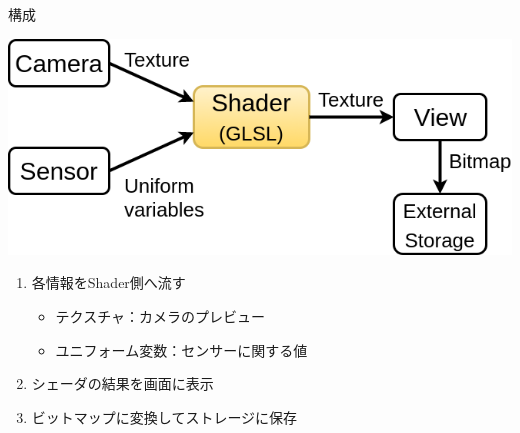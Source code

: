 \documentclass[dvipdfmx,12pt]{beamer}
\begin{document}
\begin{frame}{構成}
  \begin{center}
    \includegraphics[width=0.75\linewidth]{fig/structure.png}
  \end{center}
  \begin{block}{}
    \begin{enumerate}
      \item 各情報をShader側へ流す
      \begin{itemize}
        \item テクスチャ：カメラのプレビュー
        \item ユニフォーム変数：センサーに関する値
      \end{itemize}
      \item シェーダの結果を画面に表示
      \item ビットマップに変換してストレージに保存
    \end{enumerate}
  \end{block}
\end{frame}
\end{document}
